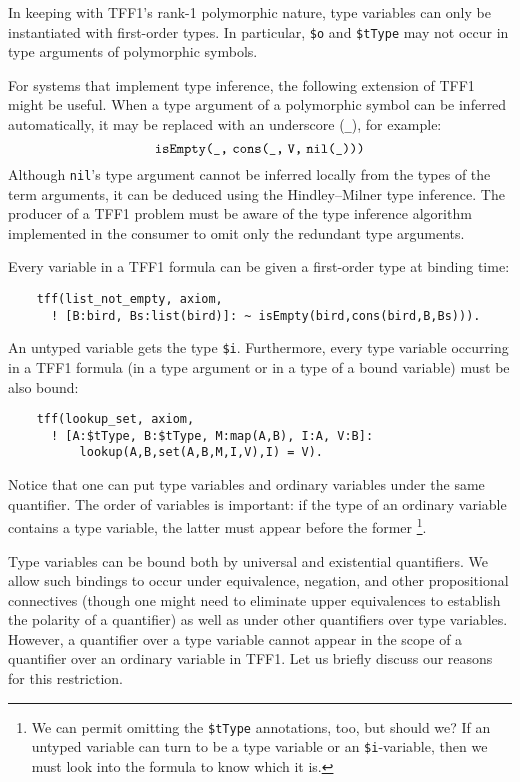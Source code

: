 In keeping with TFF1's rank-1 polymorphic nature, type variables can only be
instantiated with first-order types. In particular, \verb+$o+ and \verb+$tType+
may not occur in type arguments of polymorphic symbols.

For systems that implement type inference, the following extension
of TFF1 might be useful. When a type argument of
a polymorphic symbol can be inferred automatically, it may be
replaced with an underscore ({\tt \_}), for example:
\[\hbox{{\tt isEmpty(\_,} {\tt cons(\_,\;V,\;nil(\_)))}}\]
Although {\tt nil}'s type argument cannot be inferred locally from the types of
the term arguments, it can be deduced using the Hindley--Milner type inference.
The producer of a TFF1 problem must be aware of the type inference algorithm
implemented in the consumer to omit only the redundant type arguments.

Every variable in a TFF1 formula can be given a first-order type
at binding time:
\begin{verbatim}
    tff(list_not_empty, axiom,
      ! [B:bird, Bs:list(bird)]: ~ isEmpty(bird,cons(bird,B,Bs))).
\end{verbatim}
An untyped variable gets the type \verb+$i+.
Furthermore, every type variable occurring in a TFF1 formula
(in a type argument or in a type of a bound variable)
must be also bound:
\begin{verbatim}
    tff(lookup_set, axiom,
      ! [A:$tType, B:$tType, M:map(A,B), I:A, V:B]:
          lookup(A,B,set(A,B,M,I,V),I) = V).
\end{verbatim}
Notice that one can put type variables and ordinary variables
under the same quantifier. The order of variables is important:
if the type of an ordinary variable contains a type variable,
the latter must appear before the former%
\footnote{We can permit omitting the {\tt\$tType} annotations,
too, but should we? If an untyped variable can turn to be
a type variable or an {\tt\$i}-variable, then we must look
into the formula to know which it is.}.

Type variables can be bound both by universal and existential
quantifiers.
We allow such bindings to occur under equivalence, negation,
and other propositional connectives (though one might need
to eliminate upper equivalences to establish the polarity
of a quantifier) as well as under other quantifiers over
type variables.
However, a quantifier over a type variable cannot appear in
the scope of a quantifier over an ordinary variable in TFF1.
Let us briefly discuss our reasons for this restriction.

